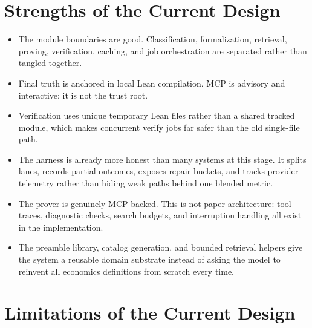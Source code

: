 \documentclass[11pt]{article}
\begin{document}
\section{Strengths of the Current Design}

\begin{itemize}[leftmargin=1.5em]
  \item The module boundaries are good. Classification, formalization,
  retrieval, proving, verification, caching, and job orchestration are
  separated rather than tangled together.
  \item Final truth is anchored in local Lean compilation. MCP is advisory and
  interactive; it is not the trust root.
  \item Verification uses unique temporary Lean files rather than a shared
  tracked module, which makes concurrent verify jobs far safer than the old
  single-file path.
  \item The harness is already more honest than many systems at this stage. It
  splits lanes, records partial outcomes, exposes repair buckets, and tracks
  provider telemetry rather than hiding weak paths behind one blended metric.
  \item The prover is genuinely MCP-backed. This is not paper architecture:
  tool traces, diagnostic checks, search budgets, and interruption handling all
  exist in the implementation.
  \item The preamble library, catalog generation, and bounded retrieval helpers
  give the system a reusable domain substrate instead of asking the model to
  reinvent all economics definitions from scratch every time.
\end{itemize}

\section{Limitations of the Current Design}
\end{document}
